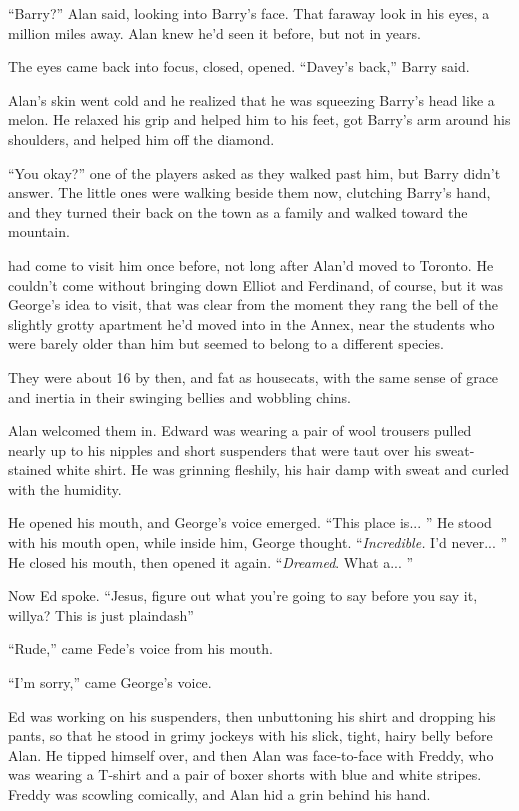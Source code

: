 ``Barry?'' Alan said, looking into Barry's face.  That faraway look in
his eyes, a million miles away.  Alan knew he'd seen it before, but
not in years.

The eyes came back into focus, closed, opened.  ``Davey's back,''
Barry said.

Alan's skin went cold and he realized that he was squeezing Barry's
head like a melon.  He relaxed his grip and helped him to his feet,
got Barry's arm around his shoulders, and helped him off the diamond.

``You okay?'' one of the players asked as they walked past him, but
Barry didn't answer.  The little ones were walking beside them now,
clutching Barry's hand, and they turned their back on the town as a
family and walked toward the mountain.

 had come to visit him once before, not long after Alan'd moved
to Toronto.  He couldn't come without bringing down Elliot and
Ferdinand, of course, but it was George's idea to visit, that was
clear from the moment they rang the bell of the slightly grotty
apartment he'd moved into in the Annex, near the students who were
barely older than him but seemed to belong to a different species.

They were about 16 by then, and fat as housecats, with the same sense
of grace and inertia in their swinging bellies and wobbling chins.

Alan welcomed them in.  Edward was wearing a pair of wool trousers
pulled nearly up to his nipples and short suspenders that were taut
over his sweat-stained white shirt.  He was grinning fleshily, his
hair damp with sweat and curled with the humidity.

He opened his mouth, and George's voice emerged.  ``This place is... 
'' He stood with his mouth open, while inside him, George thought. 
``\textit{Incredible.} I'd never...  '' He closed his mouth, then
opened it again.  ``\textit{Dreamed}.  What a...  ''

Now Ed spoke.  ``Jesus, figure out what you're going to say before you
say it, willya?  This is just plaindash{}''

``Rude,'' came Fede's voice from his mouth.

``I'm sorry,'' came George's voice.

Ed was working on his suspenders, then unbuttoning his shirt and
dropping his pants, so that he stood in grimy jockeys with his slick,
tight, hairy belly before Alan.  He tipped himself over, and then Alan
was face-to-face with Freddy, who was wearing a T-shirt and a pair of
boxer shorts with blue and white stripes.  Freddy was scowling
comically, and Alan hid a grin behind his hand.

